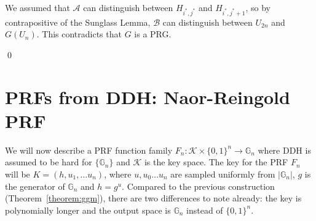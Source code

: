 \documentclass[12pt]{tufte-book}
\begin{document}
We assumed that $\mathcal{A}$ can distinguish between $H_{i^*, j^*}$ and $H_{i^*, j^*+1}$, so by contrapositive of the Sunglass Lemma, $\mathcal{B}$ can distinguish between $U_{2n}$ and $G(U_n)$. This contradicts that $G$ is a PRG.

\qed







\section{PRFs from DDH: Naor-Reingold PRF}
We will now describe a PRF function family $F_n: \mathcal{K} \times \{0,1\}^n \rightarrow \mathbb{G}_n$ where DDH is assumed to be hard for  $\{\mathbb{G}_n\}$ and $\mathcal{K}$ is the key space.
The key for the PRF $F_n$ will be $K =  (h, u_1, \ldots u_n)$, where $u,u_0\ldots u_n$ are sampled uniformly from $|\mathbb{G}_n|$, $g$ is the generator of $\mathbb{G}_n$ and $h = g^u$. Compared to the previous construction (Theorem~\ref{theorem:ggm}), there are two differences to note already: the key is polynomially longer and the output space is $\mathbb{G}_n$ instead of $\{0, 1\}^n$.
\end{document}
